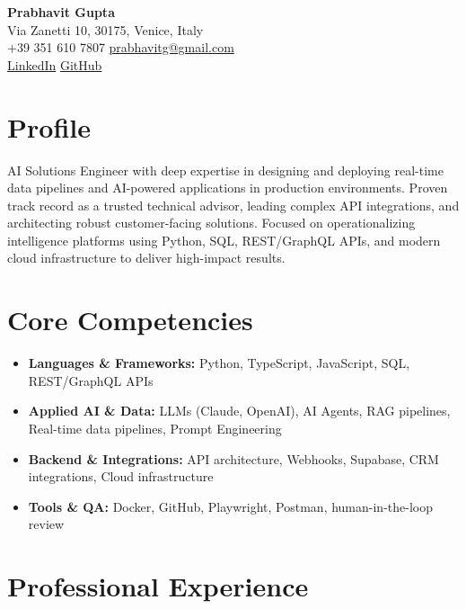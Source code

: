 \documentclass[11pt,a4paper]{article}
\begin{document}
\begin{center}
    {\huge \textbf{Prabhavit Gupta}} \\
    \vspace{4pt}
    Via Zanetti 10, 30175, Venice, Italy \\
    +39 351 610 7807 \textbar{} \href{mailto:prabhavitg@gmail.com}{prabhavitg@gmail.com} \\
    \href{https://www.linkedin.com/in/prabhavit/}{LinkedIn} \textbar{} \href{https://github.com/prab-gupta}{GitHub}
\end{center}

\vspace{10pt}

\section*{Profile}
\noindent AI Solutions Engineer with deep expertise in designing and deploying real-time data pipelines and AI-powered applications in production environments. Proven track record as a trusted technical advisor, leading complex API integrations, and architecting robust customer-facing solutions. Focused on operationalizing intelligence platforms using Python, SQL, REST/GraphQL APIs, and modern cloud infrastructure to deliver high-impact results.

\section*{Core Competencies}
\begin{itemize}[leftmargin=*, noitemsep]
    \item \textbf{Languages \& Frameworks:} Python, TypeScript, JavaScript, SQL, REST/GraphQL APIs
    \item \textbf{Applied AI \& Data:} LLMs (Claude, OpenAI), AI Agents, RAG pipelines, Real-time data pipelines, Prompt Engineering
    \item \textbf{Backend \& Integrations:} API architecture, Webhooks, Supabase, CRM integrations, Cloud infrastructure
    \item \textbf{Tools \& QA:} Docker, GitHub, Playwright, Postman, human-in-the-loop review
\end{itemize}

\section*{Professional Experience}
\end{document}
